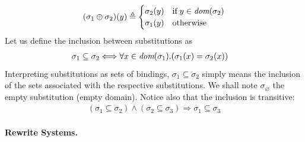 \begin{equation}
(\sigma_1 \oplus \sigma_2)(y) \triangleq
\begin{cases}
  \sigma_2(y) & \text{if} \; y \in \text{\it dom}(\sigma_2)\\
  \sigma_1(y) & \text{otherwise}
\end{cases}
\label{model:oplus:ext}
\end{equation}
Let us define the inclusion between substitutions as
\begin{align}
  \sigma_1 \subseteq \sigma_2
&\Longleftrightarrow
  \forall x \in \text{\it dom}(\sigma_1).(\sigma_1(x) =
  \sigma_2(x)) \label{model:incl}
\end{align}
Interpreting substitutions as sets of bindings, \(\sigma_1 \subseteq
\sigma_2\) simply means the inclusion of the sets associated with the
respective substitutions. We shall note \(\sigma_\varnothing\) the
empty substitution (empty domain). Notice also that the inclusion is
transitive:
\begin{gather}
(\sigma_1 \subseteq \sigma_2) \wedge (\sigma_2 \subseteq \sigma_3)
\Rightarrow \sigma_1 \subseteq \sigma_3%
\end{gather}

\paragraph{Rewrite Systems.}

